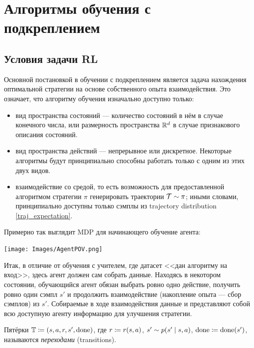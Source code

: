 \section{Алгоритмы обучения с подкреплением}

\subsection{Условия задачи RL}

Основной постановкой в обучении с подкреплением является задача нахождения оптимальной стратегии на основе собственного опыта взаимодействия. Это означает, что алгоритму обучения изначально доступно только:

\begin{itemize}
    \item вид пространства состояний --- количество состояний в нём в случае конечного числа, или размерность пространства $\mathbb{R}^d$ в случае признакового описания состояний.
    \item вид пространства действий --- непрерывное или дискретное. Некоторые алгоритмы будут принципиально способны работать только с одним из этих двух видов.
    \item взаимодействие со средой, то есть возможность для предоставленной алгоритмом стратегии $\pi$ генерировать траектории $\mathcal{T} \sim \pi$; иными словами, принципиально доступны только сэмплы из trajectory distribution \eqref{traj_expectation}.
\end{itemize}

Примерно так выглядит MDP для начинающего обучение агента:

\begin{center}
    \texttt{[image: Images/AgentPOV.png]}
\end{center}

Итак, в отличие от обучения с учителем, где датасет <<дан алгоритму на вход>>, здесь агент должен сам собрать данные. Находясь в некотором состоянии, обучающийся агент обязан выбрать ровно одно действие, получить ровно один сэмпл $s'$ и продолжить взаимодействие (накопление опыта --- сбор сэмплов) из $s'$. Собираемые в ходе взаимодействия данные и представляют собой всю доступную агенту информацию для улучшения стратегии.

\begin{definition}
Пятёрки $\T \HM\coloneqq \left( s, a, r, s', \done \right)$, где $r \HM\coloneqq r(s, a)$, $s' \HM\sim p(s' \HM\mid s, a)$, $\done \HM\coloneqq \done(s')$, называются \emph{переходами} (transitions). 
\end{definition}

